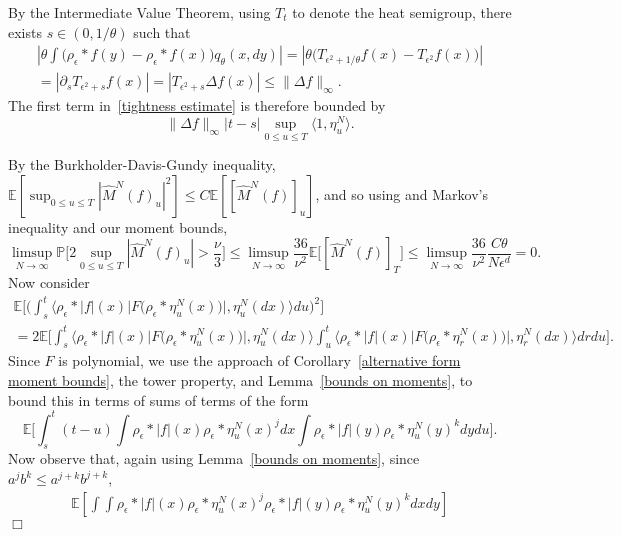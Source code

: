 \documentclass[12pt]{article}
\newenvironment {proof}{{\noindent\bf Proof }}{\hfill $\Box$ \medskip}
\newcommand{\IP}{\mathbb P}
\newcommand{\IE}{\mathbb E}
\numberwithin{equation}{section}
\begin{document}
\begin{proof}
By the Intermediate Value Theorem, using $T_t$ to denote the heat semigroup,
there exists $s\in (0,1/\theta)$ such that
\begin{multline*}
\left|
\theta\int\big(\rho_\epsilon*f(y)-\rho_\epsilon*f(x)\big)
q_{\theta}(x,dy) \right|
=
\left|\theta\Big(T_{\epsilon^2+1/\theta}f(x)-T_{\epsilon^2}f(x)\Big)\right|
\\
=
\left|\partial_sT_{\epsilon^2+s}f(x)\right|=\left|T_{\epsilon^2+s}\Delta f(x)\right|
\leq\|\Delta f\|_\infty.
\end{multline*}
The first term in~\eqref{tightness estimate} is therefore bounded by
$$
    \| \Delta f \|_\infty |t-s| \sup_{0 \leq u \leq T } \langle 1, \eta_u^N \rangle .
$$

By the Burkholder-Davis-Gundy inequality,
$\IE[\sup_{0 \le u \le T} |\widehat{M}^N(f)_u|^2] \le C \IE[[\widehat{M}^N(f)]_u]$,
and so using
and Markov's inequality and
our moment bounds,
\begin{equation}
\label{martingale term to zero}
    \limsup_{N\to\infty}\IP\Big[
        2\sup_{0\leq u\leq T}|\widehat{M}^N(f)_u|
        >\frac{\nu}{3}
    \Big]
    \leq
    \limsup_{N\to\infty} \frac{36}{\nu^2} \IE\big[[\widehat{M}^N(f)]_T\big]
    \leq
    \limsup_{N\to\infty}\frac{36}{\nu^2}\frac{C\theta}{N\epsilon^d} 
    =0. 
\end{equation}
Now consider
\begin{multline}
	\label{square of F-integral}
\IE\Big[
	\Big(\int_s^t\big\langle\rho_\epsilon*|f|(x) \big|F\big(\rho_\epsilon*\eta_u^N(x)\big)\big|,
\eta_u^N(dx)\big\rangle du\Big)^2\Big]
\\
=
2\IE\Big[
	\int_s^t\big\langle\rho_\epsilon*|f|(x) \big|F\big(\rho_\epsilon*\eta_u^N(x)\big)\big|,
\eta_u^N(dx)\big\rangle 
	\int_u^t\big\langle \rho_\epsilon*|f|(x)\big|F\big(\rho_\epsilon*\eta_r^N(x)\big)\big|,
\eta_r^N(dx)\big\rangle dr
du\Big].
\end{multline}
Since $F$ is polynomial, we use the approach
of Corollary~\ref{alternative form moment bounds}, the tower 
property, and 
Lemma~\ref{bounds on moments}, to bound this
in terms of sums of terms of the form
\[
\IE\Big[\int_s^t(t-u)\int\rho_\epsilon*|f|(x)\rho_\epsilon*\eta_u^N(x)^jdx
\int\rho_\epsilon*|f|(y)\rho_\epsilon*\eta_u^N(y)^kdydu\Big].
\]
Now observe that, again using Lemma~\ref{bounds on moments}, 
since $a^j b^k \le a^{j+k} b^{j+k}$,
\begin{multline*}
	\IE\left[	\int\int\rho_\epsilon*|f|(x)\rho_\epsilon*\eta_u^N(x)^j
	\rho_\epsilon*|f|(y)\rho_\epsilon*\eta_u^N(y)^k dx dy\right]

\end{multline*}
\end{proof}
\end{document}
